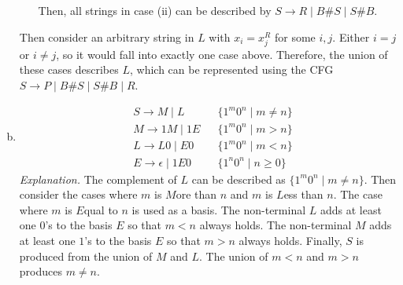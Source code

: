 \documentclass[11pt]{article}
\begin{document}
\begin{solution}
\begin{enumerate}[(a)]
\begin{enumerate}[i.]
Then, all strings in case (ii) can be described by $S\to R \mid B\#S \mid S\#B$.
\end{enumerate}
Then consider an arbitrary string in $L$ with $x_i=x_j^R$ for some $i, j$. Either $i=j$ or $i\neq j$, so it would fall into exactly one case above. Therefore, the union of these cases describes $L$, which can be represented using the CFG $S\to P \mid B\#S \mid S\#B \mid R$.
\item
\begin{align*}
&S\to M \mid L &&\{ 1^m0^n \mid m\neq n \}\\
&M\to 1M \mid 1E &&\{ 1^m0^n \mid m>n \}\\
&L\to L0 \mid E0 &&\{ 1^m0^n \mid m<n \}\\
&E\to \epsilon \mid 1E0 &&\{ 1^n0^n \mid n \geq 0 \}
\end{align*}
\emph{Explanation. }The complement of $L$ can be described as $\{1^m0^n \mid m\neq n\}$. Then consider the cases where $m$ is $M$ore than $n$ and $m$ is $L$ess than $n$. The case where $m$ is $E$qual to $n$ is used as a basis. The non-terminal $L$ adds at least one $0$'s to the basis $E$ so that $m<n$ always holds. The non-terminal $M$ adds at least one $1$'s to the basis $E$ so that $m>n$ always holds. Finally, $S$ is produced from the union of $M$ and $L$. The union of $m<n$ and $m>n$ produces $m\neq n$.
\end{enumerate}
\end{solution}
\end{document}
